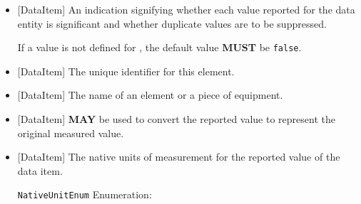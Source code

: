 \begin{itemize}
\item {}[DataItem] \newline An indication signifying whether each value reported for the \gls{data entity} is significant and whether duplicate values are to be suppressed.

If a value is not defined for , the default value \textbf{MUST} be \texttt{false}.

\item {}[DataItem] \newline The unique identifier for this element.

\item {}[DataItem] \newline The name of an element or a piece of equipment.

\item {}[DataItem] \newline {} \textbf{MAY} be used to convert the reported value to represent the original measured value.

\item {}[DataItem] \newline The native units of measurement for the reported value of the data item.

\texttt{NativeUnitEnum} Enumeration:


\end{itemize}
